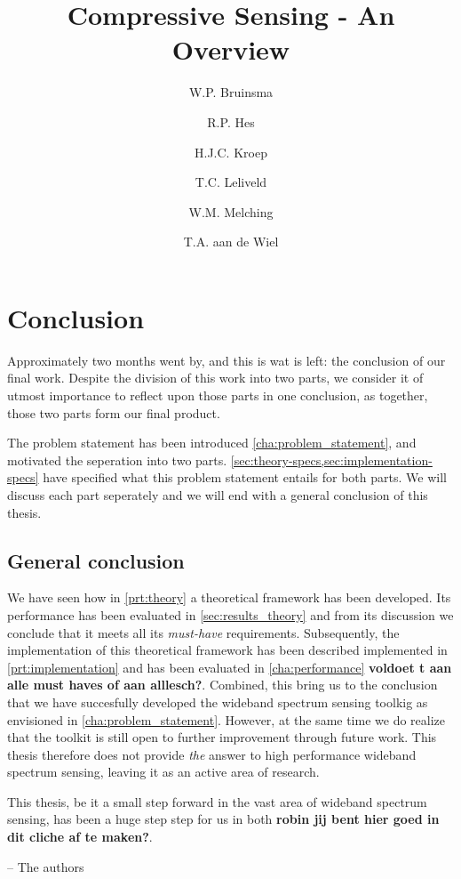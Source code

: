 \documentclass[a4paper, openany, oneside]{memoir}
\title{Compressive Sensing - An Overview}
\author{W.P. Bruinsma \and R.P. Hes \and H.J.C. Kroep \and T.C. Leliveld \and W.M. Melching \and T.A. aan de Wiel}
\begin{document}
\chapter{Conclusion}


Approximately two months went by, and this is wat is left: the conclusion of our final work. Despite the division of this work into two parts, we consider it of utmost importance to reflect upon those parts in one conclusion, as together, those two parts form our final product. 

The problem statement has been introduced \cref{cha:problem_statement}, and motivated the seperation into two parts. \cref{sec:theory-specs,sec:implementation-specs} have specified what this problem statement entails for both parts. We will discuss each part seperately and we will end with a general conclusion of this thesis.

\section{General conclusion}
We have seen how in \cref{prt:theory} a theoretical framework has been developed. Its performance has been evaluated in \cref{sec:results_theory} and from its discussion we conclude that it meets all its \emph{must-have} requirements. Subsequently, the implementation of this theoretical framework has been described implemented in \cref{prt:implementation} and has been evaluated in \cref{cha:performance} \textbf{voldoet t aan alle must haves of aan alllesch?}. Combined, this bring us to the conclusion that we have succesfully developed the wideband spectrum sensing toolkig as envisioned in \cref{cha:problem_statement}. However, at the same time we do realize that the toolkit is still open to further improvement through future work. This thesis therefore does not provide \emph{the} answer to high performance wideband spectrum sensing, leaving it as an active area of research. 

This thesis, be it a small step forward in the vast area of wideband spectrum sensing, has been a huge step step for us in both \textbf{robin jij bent hier goed in dit cliche af te maken?}.

\raggedleft -- The authors \qquad\qquad\qquad
\end{document}
